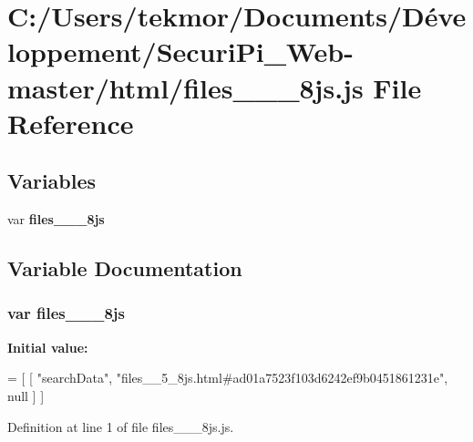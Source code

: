 \section{C\+:/\+Users/tekmor/\+Documents/\+Développement/\+Securi\+Pi\+\_\+\+Web-\/master/html/files\+\_\+\+\_\+\_\+8js.js File Reference}
\label{files____5__8js_8js}
\subsection*{Variables}
\begin{DoxyCompactItemize}
\item 
var {\bf files\+\_\+\+\_\+\_\+8js}
\end{DoxyCompactItemize}


\subsection{Variable Documentation}
\subsubsection[{files\+\_\+\+\_\+5\+\_\+8js}]{\setlength{\rightskip}{0pt plus 5cm}var files\+\_\+\+\_\+\_\+8js}\label{files____5__8js_8js_ac682d6adc03bbdbe840c1078801a4c74}
{\bfseries Initial value\+:}
\begin{DoxyCode}
=
[
    [ \textcolor{stringliteral}{"searchData"}, \textcolor{stringliteral}{"files\_\_5\_8js.html#ad01a7523f103d6242ef9b0451861231e"}, null ]
]
\end{DoxyCode}


Definition at line 1 of file files\+\_\+\+\_\+\_\+8js.\+js.

